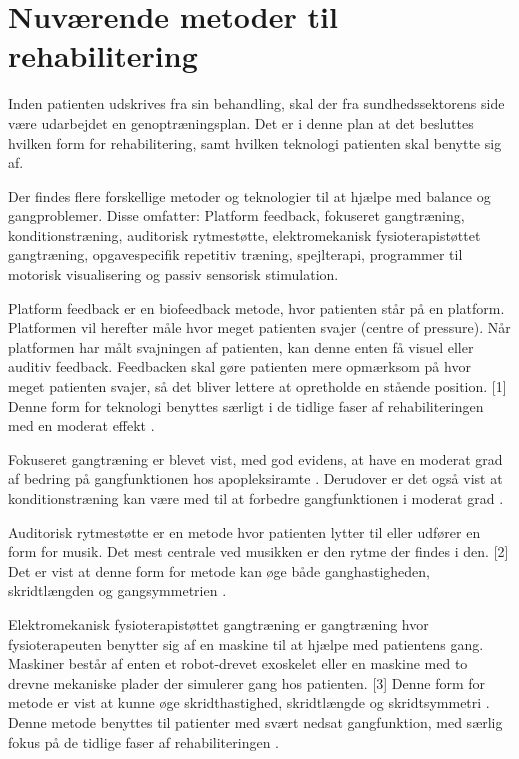 \section{Nuværende metoder til rehabilitering}

Inden patienten udskrives fra sin behandling, skal der fra sundhedssektorens side være udarbejdet en genoptræningsplan. Det er i denne plan at det besluttes hvilken form for rehabilitering, samt hvilken teknologi patienten skal benytte sig af. \cite{Sundhedsstyrelsen2011a}

Der findes flere forskellige metoder og teknologier til at hjælpe med balance og gangproblemer. Disse omfatter: Platform feedback, fokuseret gangtræning, konditionstræning, auditorisk rytmestøtte, elektromekanisk fysioterapistøttet gangtræning, opgavespecifik repetitiv træning, spejlterapi, programmer til motorisk visualisering og passiv sensorisk stimulation. \cite{Sundhedsstyrelsen2011a}

Platform feedback er en biofeedback metode, hvor patienten står på en platform. Platformen vil herefter måle hvor meget patienten svajer (centre of pressure). Når platformen har målt svajningen af patienten, kan denne enten få visuel eller auditiv feedback. Feedbacken skal gøre patienten mere opmærksom på hvor meget patienten svajer, så det bliver lettere at opretholde en stående position. [1]
Denne form for teknologi benyttes særligt i de tidlige faser af rehabiliteringen med en moderat effekt \cite{Sundhedsstyrelsen2011a}.

Fokuseret gangtræning er blevet vist, med god evidens, at have en moderat grad af bedring på gangfunktionen hos apopleksiramte \cite{Sundhedsstyrelsen2010}. Derudover er det også vist at konditionstræning kan være med til at forbedre gangfunktionen i moderat grad \cite{Sundhedsstyrelsen2010}. 

Auditorisk rytmestøtte er en metode hvor patienten lytter til eller udfører en form for musik. Det mest centrale ved musikken er den rytme der findes i den. [2] Det er vist at denne form for metode kan øge både ganghastigheden, skridtlængden og gangsymmetrien \cite{Sundhedsstyrelsen2010}. 

Elektromekanisk fysioterapistøttet gangtræning er gangtræning hvor fysioterapeuten benytter sig af en maskine til at hjælpe med patientens gang. Maskiner består af enten et robot-drevet exoskelet eller en maskine med to drevne mekaniske plader der simulerer gang hos patienten. [3] Denne form for metode er vist at kunne øge skridthastighed, skridtlængde og skridtsymmetri \cite{Sundhedsstyrelsen2010}. Denne metode benyttes til patienter med svært nedsat gangfunktion, med særlig fokus på de tidlige faser af rehabiliteringen \cite{Sundhedsstyrelsen2011a}.

